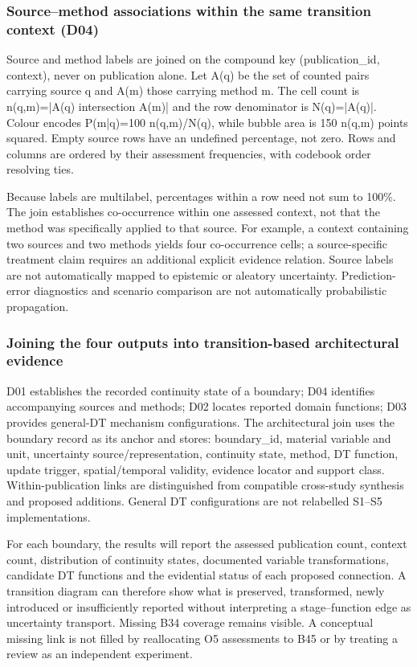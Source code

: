 \subsubsection{Source–method associations within the same transition context (D04)}

Source and method labels are joined on the compound key (publication\_id, context), never on publication alone. Let A(q) be the set of counted pairs carrying source q and A(m) those carrying method m. The cell count is n(q,m)=|A(q) intersection A(m)| and the row denominator is N(q)=|A(q)|. Colour encodes P(m|q)=100 n(q,m)/N(q), while bubble area is 150 n(q,m) points squared. Empty source rows have an undefined percentage, not zero. Rows and columns are ordered by their assessment frequencies, with codebook order resolving ties.

Because labels are multilabel, percentages within a row need not sum to 100\%. The join establishes co-occurrence within one assessed context, not that the method was specifically applied to that source. For example, a context containing two sources and two methods yields four co-occurrence cells; a source-specific treatment claim requires an additional explicit evidence relation. Source labels are not automatically mapped to epistemic or aleatory uncertainty. Prediction-error diagnostics and scenario comparison are not automatically probabilistic propagation.

\subsubsection{Joining the four outputs into transition-based architectural evidence}

D01 establishes the recorded continuity state of a boundary; D04 identifies accompanying sources and methods; D02 locates reported domain functions; D03 provides general-DT mechanism configurations. The architectural join uses the boundary record as its anchor and stores: boundary\_id, material variable and unit, uncertainty source/representation, continuity state, method, DT function, update trigger, spatial/temporal validity, evidence locator and support class. Within-publication links are distinguished from compatible cross-study synthesis and proposed additions. General DT configurations are not relabelled S1--S5 implementations.

For each boundary, the results will report the assessed publication count, context count, distribution of continuity states, documented variable transformations, candidate DT functions and the evidential status of each proposed connection. A transition diagram can therefore show what is preserved, transformed, newly introduced or insufficiently reported without interpreting a stage--function edge as uncertainty transport. Missing B34 coverage remains visible. A conceptual missing link is not filled by reallocating O5 assessments to B45 or by treating a review as an independent experiment.

